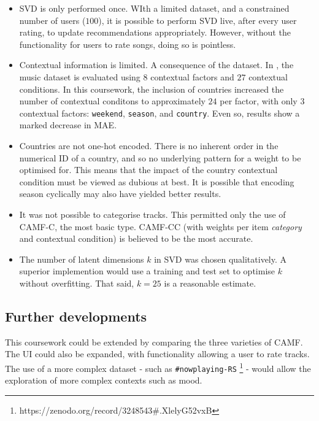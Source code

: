 \documentclass[conference]{IEEEtran}
\begin{document}
\begin{itemize}

\item{SVD is only performed once. WIth a limited dataset, and a constrained number of users ($100$), it is possible to perform SVD live, after every user rating, to update recommendations appropriately. However, without the functionality for users to rate songs, doing so is pointless.}
\item{Contextual information is limited. A consequence of the dataset. In \cite{baltrunas_et_al_2011}, the music dataset is evaluated using $8$ contextual factors and $27$ contextual conditions. In this coursework, the inclusion of countries increased the number of contextual conditons to approximately $24$ per factor, with only $3$ contextual factors: \verb|weekend|, \verb|season|, and \verb|country|. Even so, results show a marked decrease in MAE.}
\item{Countries are not one-hot encoded. There is no inherent order in the numerical ID of a country, and so no underlying pattern for a weight to be optimised for. This means that the impact of the country contextual condition must be viewed as dubious at best. It is possible that encoding season cyclically may also have yielded better results.}
\item{It was not possible to categorise tracks}. This permitted only the use of CAMF-C, the most basic type. CAMF-CC (with weights per item \textit{category} and contextual condition) is believed to be the most accurate.
\item{The number of latent dimensions $k$ in SVD was chosen qualitatively. A superior implemention would use a training and test set to optimise $k$ without overfitting. That said, $k = 25$ is a reasonable estimate.}

\end{itemize}

\subsection{Further developments}

This coursework could be extended by comparing the three varieties of CAMF. The UI could also be expanded, with functionality allowing a user to rate tracks. The use of a more complex dataset - such as \verb|#nowplaying-RS| \footnote{https://zenodo.org/record/3248543\#.XlelyG52vxB} - would allow the exploration of more complex contexts such as mood.

\printbibliography
\end{document}
